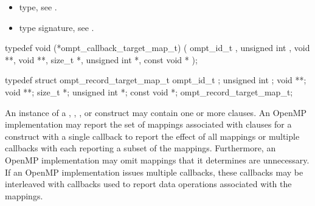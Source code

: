 \crossreferences
\begin{itemize}
\item {} type, see
.
\item {} type signature, see
.
\end{itemize}




\label{sec:ompt_callback_target_map_t}
\format

\begin{ccppspecific}
\begin{omptCallback}
typedef void (*ompt_callback_target_map_t) (
  ompt_id_t ,
  unsigned int ,
  void **,
  void **,
  size_t *,
  unsigned int *,
  const void *
);
\end{omptCallback}
\end{ccppspecific}


\record

\begin{ccppspecific}
\begin{omptRecord}
typedef struct ompt_record_target_map_t {
  ompt_id_t ;
  unsigned int ;
  void **;
  void **;
  size_t *;
  unsigned int *;
  const void *;
} ompt_record_target_map_t;
\end{omptRecord}
\end{ccppspecific}


\descr
An instance of a , , , or 
 construct may contain one or more  clauses.
An OpenMP implementation may report the set of mappings associated with  clauses for a construct
with a single  callback to report the effect of all mappings or multiple
 callbacks with each reporting a subset of the mappings.
Furthermore, an OpenMP implementation may omit mappings that it determines are unnecessary.
If an OpenMP implementation issues multiple 
callbacks, these callbacks may be interleaved with  callbacks
used to report data operations associated with the mappings.

